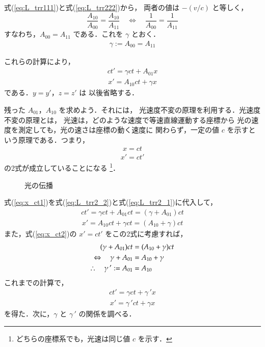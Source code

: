 式(\ref{eq:L_trr111})と式(\ref{eq:L_trr222})から，
両者の値は $-(v/c)$ と等しく，
\begin{equation*}
\frac{A_{10}}{A_{00}}=\frac{A_{10}}{A_{11}}
\quad\Leftrightarrow\quad
\frac{1}{A_{00}}=\frac{1}{A_{11}}
\end{equation*}
すなわち，$A_{00}=A_{11}$ である．これを $\gamma$ とおく．
\begin{align}
\gamma:= A_{00}=A_{11}
\end{align}

これらの計算により，
\begin{align}\label{eq:L_trr2_2}
ct'=\gamma ct +A_{01}x
\end{align}
\begin{align}\label{eq:L_trr2_1}
x'=A_{10}ct+\gamma x
\end{align}
である．$y=y'$，$z=z'$ は
以後省略する．

残った $A_{01}$，$A_{10}$ を求めよう．それには，
光速度不変の原理を利用する．光速度不変の原理とは，
光速は，どのような速度で等速直線運動する座標から
光の速度を測定しても，光の速さは座標の動く速度に
関わらず，一定の値 $c$ を示すという原理である．つまり，
\begin{align}\label{eq:x_ct1}
x=ct
\end{align}
\begin{align}\label{eq:x_ct2}
x'=ct'
\end{align}
の2式が成立していることになる
    \footnote{
        どちらの座標系でも，光速は同じ値 $c$ を示す．
    }．
                \begin{figure}[hbt]
                    \begin{center}
                        \caption{光の伝播}
                        \label{fig:L_rt2}
                    \end{center}
                \end{figure}

式(\ref{eq:x_ct1})を式(\ref{eq:L_trr2_2})と式(\ref{eq:L_trr2_1})に代入して，
\begin{align}
ct'=\gamma ct +A_{01}ct = (\gamma + A_{01})ct
\end{align}
\begin{align}
x'=A_{10}ct+\gamma ct =  (A_{10}+\gamma )ct
\end{align}
また，式(\ref{eq:x_ct2})の $x'=ct'$ をこの2式に考慮すれば，
\begin{align}
(\gamma + A_{01})ct &= (A_{10}+\gamma )ct \notag \\
\Leftrightarrow \quad
\gamma + A_{01} &= A_{10}+\gamma \notag \\
\therefore \quad
\gamma\,' := A_{01} &= A_{10}
\end{align}
これまでの計算で，
\begin{align}
ct'=\gamma ct +\gamma\,' x
\end{align}
\begin{align}
x'=\gamma\,' ct+\gamma x
\end{align}
を得た．次に，$\gamma$ と $\gamma\,'$ の関係を調べる．


